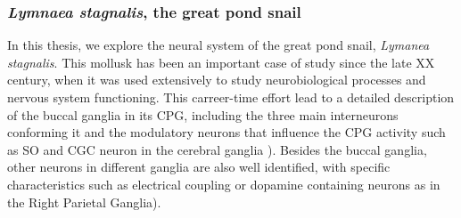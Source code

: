 \subsubsection{\textit{Lymnaea stagnalis}, the great pond snail}
In this thesis, we explore the neural system of the great pond snail, \textit{Lymanea stagnalis}. This mollusk has been an important case of study since the late XX century, when it was used extensively to study neurobiological processes and nervous system functioning. This carreer-time effort lead to a detailed description of the buccal ganglia 
in its CPG, including the three main interneurons conforming it \parencite{benjamin_snail_1989,benjamin_morphology_1979,rose_relationship_1979,brierley_behavioral_1997} and the modulatory neurons that influence the CPG activity such as SO and CGC neuron in the cerebral ganglia \parencite{rose_interneuronal_1981,mccrohan_patterns_1980,kemenes_multiple_2001}). Besides the buccal ganglia, other neurons in different ganglia are also well identified, with specific characteristics such as electrical coupling or dopamine containing neurons as in the Right Parietal Ganglia\parencite{benjamin_electrotonic_1986,winlow_multiple_1981}).

